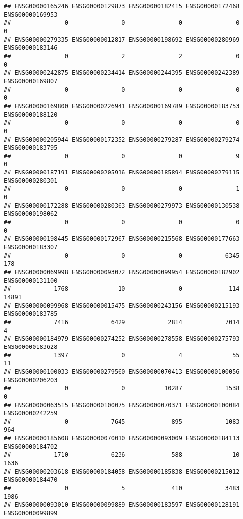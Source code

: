 \documentclass[
]{article}
\begin{document}
\begin{verbatim}
## ENSG00000165246 ENSG00000129873 ENSG00000182415 ENSG00000172468 ENSG00000169953 
##               0               0               0               0               0 
## ENSG00000279335 ENSG00000012817 ENSG00000198692 ENSG00000280969 ENSG00000183146 
##               0               2               2               0               0 
## ENSG00000242875 ENSG00000234414 ENSG00000244395 ENSG00000242389 ENSG00000169807 
##               0               0               0               0               0 
## ENSG00000169800 ENSG00000226941 ENSG00000169789 ENSG00000183753 ENSG00000188120 
##               0               0               0               0               0 
## ENSG00000205944 ENSG00000172352 ENSG00000279287 ENSG00000279274 ENSG00000183795 
##               0               0               0               9               0 
## ENSG00000187191 ENSG00000205916 ENSG00000185894 ENSG00000279115 ENSG00000280301 
##               0               0               0               1               0 
## ENSG00000172288 ENSG00000280363 ENSG00000279973 ENSG00000130538 ENSG00000198062 
##               0               0               0               0               0 
## ENSG00000198445 ENSG00000172967 ENSG00000215568 ENSG00000177663 ENSG00000183307 
##               0               0               0            6345             178 
## ENSG00000069998 ENSG00000093072 ENSG00000099954 ENSG00000182902 ENSG00000131100 
##            1768              10               0             114           14891 
## ENSG00000099968 ENSG00000015475 ENSG00000243156 ENSG00000215193 ENSG00000183785 
##            7416            6429            2814            7014               4 
## ENSG00000184979 ENSG00000274252 ENSG00000278558 ENSG00000275793 ENSG00000183628 
##            1397               0               4              55              11 
## ENSG00000100033 ENSG00000279560 ENSG00000070413 ENSG00000100056 ENSG00000206203 
##               0               0           10287            1538               0 
## ENSG00000063515 ENSG00000100075 ENSG00000070371 ENSG00000100084 ENSG00000242259 
##               0            7645             895            1083             964 
## ENSG00000185608 ENSG00000070010 ENSG00000093009 ENSG00000184113 ENSG00000184702 
##            1710            6236             588              10            1636 
## ENSG00000203618 ENSG00000184058 ENSG00000185838 ENSG00000215012 ENSG00000184470 
##               0               5             410            3483            1986 
## ENSG00000093010 ENSG00000099889 ENSG00000183597 ENSG00000128191 ENSG00000099899 

\end{verbatim}
\end{document}
